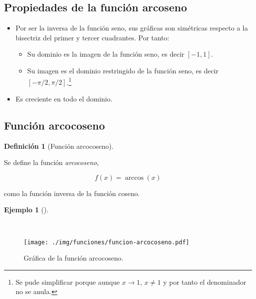 \documentclass[
  a4paper,
]{scrreport}
\providecommand{\tightlist}{%
  \setlength{\itemsep}{0pt}\setlength{\parskip}{0pt}}\usepackage{longtable,booktabs,array}
\theoremstyle{plain}
\theoremstyle{definition}
\theoremstyle{plain}
\theoremstyle{plain}
\theoremstyle{definition}
\newtheorem{example}{Ejemplo}[chapter]
\theoremstyle{definition}
\newtheorem{definition}{Definición}[chapter]
\theoremstyle{remark}
\begin{document}
\subsection{Propiedades de la función
arcoseno}\label{propiedades-de-la-funciuxf3n-arcoseno}

\begin{itemize}
\tightlist
\item
  Por ser la inversa de la función seno, sus gráficas son simétricas
  respecto a la bisectriz del primer y tercer cuadrantes. Por tanto:

  \begin{itemize}
  \tightlist
  \item
    Su dominio es la imagen de la función seno, es decir \([-1,1]\).
  \item
    Su imagen es el dominio restringido de la función seno, es decir
    \([-\pi/2,\pi/2]\).\footnote{Se pude simplificar porque aunque
      \(x\to 1\), \(x\neq 1\) y por tanto el denominador no se anula.}
  \end{itemize}
\item
  Es creciente en todo el dominio.
\end{itemize}

\subsection{Función arcocoseno}\label{funciuxf3n-arcocoseno}

\begin{definition}[Función
arcocoseno]\protect\hypertarget{def-funcion-arcocoseno}{}\label{def-funcion-arcocoseno}

Se define la función \emph{arcocoseno},

\[f(x)=\operatorname{arccos}(x)\]

como la función inversa de la función coseno.

\end{definition}

\begin{example}[]\protect\hypertarget{exm-funcion-arcocoseno}{}\label{exm-funcion-arcocoseno}

~

\begin{figure}[H]

{\centering \texttt{[image: ./img/funciones/funcion-arcocoseno.pdf]}

}

\caption{Gráfica de la función arcocoseno.}

\end{figure}%

\end{example}
\end{document}

